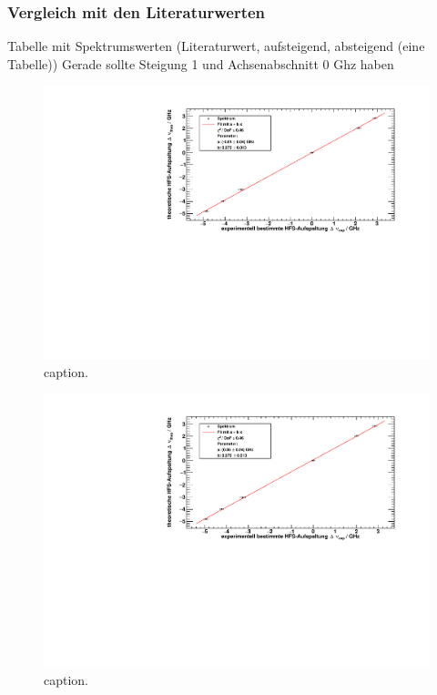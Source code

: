 \subsubsection*{Vergleich mit den Literaturwerten}
Tabelle mit Spektrumswerten (Literaturwert, aufsteigend, absteigend (eine Tabelle))
Gerade sollte Steigung 1 und Achsenabschnitt 0 Ghz haben

\begin{figure}[H]
\begin{center}
  \includegraphics[width=\textwidth]{../img/part2/up-spectrum.pdf}
  \caption{caption.}
  \label{img:hfs:spectrum:up}
\end{center}
\end{figure}

\begin{figure}[H]
\begin{center}
  \includegraphics[width=\textwidth]{../img/part2/down-spectrum.pdf}
  \caption{caption.}
  \label{img:hfs:spectrum:down}
\end{center}
\end{figure}
